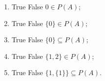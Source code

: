 \documentclass[11pt]{article}
\newcounter{sumscore} \newcounter{quesno} \newcounter{inquesno} \newcounter{partno} \setcounter{inquesno}{1} \newcounter{altquesno}
\begin{document}
 \begin{enumerate}
 \item[] True \hspace{1cm} False \hspace{1cm} $0 \in P(A)$;\vspace{0.3cm}
 \item[] True \hspace{1cm} False \hspace{1cm}  $\{0\} \in P(A)$;\vspace{0.3cm}      
 \item[] True \hspace{1cm} False \hspace{1cm}  $\{0\} \subseteq P(A)$;\vspace{0.3cm}   
 \item[] True \hspace{1cm} False \hspace{1cm}  $\{1,2\} \in P(A)$;\vspace{0.3cm}
 \item[] True \hspace{1cm} False \hspace{1cm}  $\{1,\{1\}\} \subseteq P(A)$.\\ 
 \end{enumerate}
 



\newpage


\end{document}
